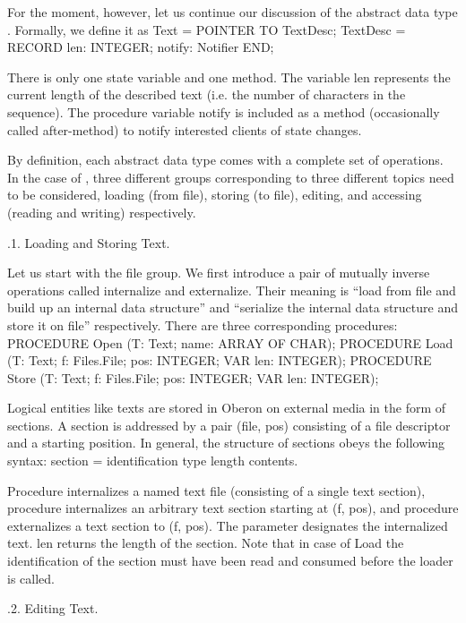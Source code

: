 For the moment, however, let us continue our discussion of the
abstract data type . Formally, we define it as
\begintt
Text = POINTER TO TextDesc;
TextDesc = RECORD
  len: INTEGER;
  notify: Notifier
END;
\endtt

\noindent There is only one state variable and one method. The variable len
represents the current length of the described text (i.e. the number
of characters in the sequence). The procedure variable notify is
included as a method (occasionally called after-method) to notify
interested clients of state changes.

By definition, each abstract data type comes with a complete set of
operations. In the case of , three different groups corresponding
to three different topics need to be considered, loading (from file),
storing (to file), editing, and accessing (reading and writing)
respectively.

.1. Loading and Storing Text.

Let us start with the file group. We first introduce a pair of
mutually inverse operations called internalize and externalize. Their
meaning is ``load from file and build up an internal data structure''
and ``serialize the internal data structure and store it on file''
respectively. There are three corresponding procedures:
\begintt
PROCEDURE Open (T: Text; name: ARRAY OF CHAR);
PROCEDURE Load (T: Text; f: Files.File; pos: INTEGER; VAR len: INTEGER);
PROCEDURE Store (T: Text; f: Files.File; pos: INTEGER; VAR len: INTEGER);
\endtt

\noindent Logical entities like texts are stored in Oberon on external media in
the form of sections. A section is addressed by a pair (file, pos)
consisting of a file descriptor and a starting position. In general,
the structure of sections obeys the following syntax:
\begintt
section = identification type length contents.
\endtt

\noindent Procedure  internalizes a named text file (consisting of a single
text section), procedure  internalizes an arbitrary text section
starting at (f, pos), and procedure  externalizes a text section
to (f, pos). The parameter  designates the internalized text. len
returns the length of the section. Note that in case of Load the
identification of the section must have been read and consumed before
the loader is called.

.2. Editing Text.


